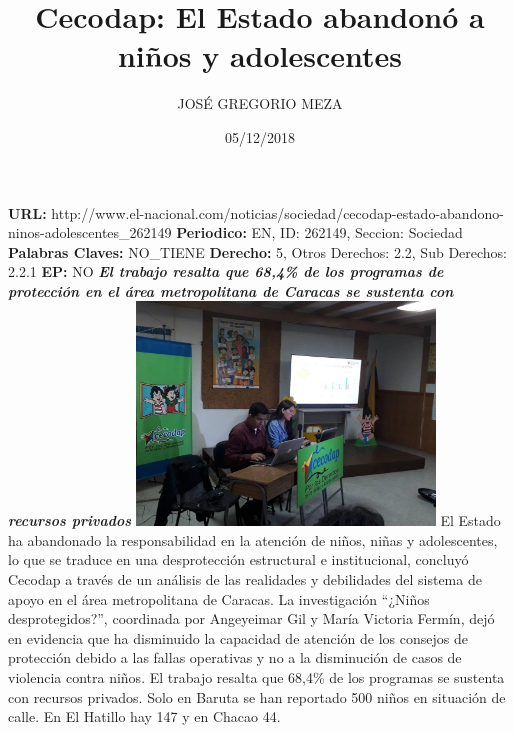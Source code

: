 \documentclass{article}%
\title{\textbf{Cecodap: El Estado abandonó a niños y adolescentes}}%
\author{JOSÉ GREGORIO MEZA}%
\date{05/12/2018}%
\begin{document}
%
\normalsize%
\maketitle%
\textbf{URL: }%
http://www.el{-}nacional.com/noticias/sociedad/cecodap{-}estado{-}abandono{-}ninos{-}adolescentes\_262149\newline%
%
\textbf{Periodico: }%
EN, %
ID: %
262149, %
Seccion: %
Sociedad\newline%
%
\textbf{Palabras Claves: }%
NO\_TIENE\newline%
%
\textbf{Derecho: }%
5, %
Otros Derechos: %
2.2, %
Sub Derechos: %
2.2.1\newline%
%
\textbf{EP: }%
NO\newline%
\newline%
%
\textbf{\textit{El trabajo resalta que 68,4\% de los programas de protección en el área metropolitana de Caracas se sustenta con recursos privados}}%
\newline%
\newline%
%
\includegraphics[width=300px]{44.jpg}%
\newline%
%
El Estado ha abandonado la responsabilidad en la atención de niños, niñas y adolescentes, lo que se traduce en una desprotección estructural e institucional, concluyó Cecodap a través de un análisis de las realidades y debilidades del sistema de apoyo en el área metropolitana de Caracas.%
\newline%
%
La investigación “¿Niños desprotegidos?”, coordinada por Angeyeimar Gil y María Victoria Fermín, dejó en evidencia que ha disminuido la capacidad de atención de los consejos de protección debido a las fallas operativas y no a la disminución de casos de violencia contra niños.%
\newline%
%
El trabajo resalta que 68,4\% de los programas se sustenta con recursos privados.%
\newline%
%
Solo en Baruta se han reportado 500 niños en situación de calle. En El Hatillo hay 147 y en Chacao 44.%
\end{document}
